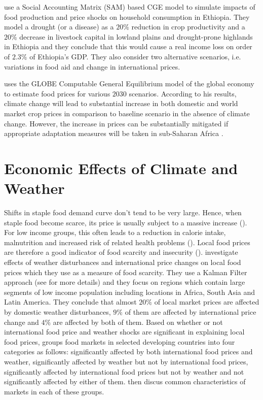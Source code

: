 \documentclass[a4paper,12pt]{article}
\begin{document}
\cite{robinson2010} use a Social Accounting Matrix (SAM) based CGE model to simulate impacts of food production and price shocks on household consumption in Ethiopia. They model a drought (or a disease) as a $20\%$ reduction in crop productivity and a $20\%$ decrease in livestock capital in lowland plains and drought-prone highlands in Ethiopia and they conclude that this would cause a real income loss on order of $2.3\%$ of Ethiopia's GDP. They also consider two alternative scenarios, i.e. variations in food aid and change in international prices.

\cite{OxfamIDS} uses the GLOBE Computable General Equilibrium model of the global economy to estimate food prices for various $2030$ scenarios. According to his results, climate change will lead to substantial increase in both domestic and world market crop prices in comparison to baseline scenario in the absence of climate change. However, the increase in prices can be substantially mitigated if appropriate adaptation measures will be taken in sub-Saharan Africa \citep{OxfamIDS}.
 \section*{Economic Effects of Climate and Weather}
 
Shifts in staple food demand curve don't tend to be very large. Hence, when staple food become scarce, its price is usually subject to a massive increase (\citealp{Brown2015, brown2014book}). For low income groups, this often leads to a reduction in calorie intake, malnutrition and increased risk of related health problems (\citealp{Golden2011, Handa2006}). Local food prices are therefore a good indicator of food scarcity and insecurity (\citealp{baffes2017, Brown2015}). \cite{Brown2015} investigate effects of weather disturbances and international price changes on local food prices which they use as a measure of food scarcity. They use a Kalman Filter approach (see \cite{KoopmanSJ} for more details) and they focus on regions which contain large segments of low income population including locations in Africa, South Asia and Latin America. They conclude that almost $20\%$ of local market prices are affected by domestic weather disturbances, $9\%$ of them are affected by international price change and $4\%$ are affected by both of them. Based on whether or not international food price and weather shocks are significant in explaining local food prices, \cite{brown2014book} groups food markets in selected developing countries into four categories as follows: significantly affected by both international food prices and weather, significantly affected by weather but not by international food prices, significantly affected by international food prices but not by weather and not significantly affected by either of them. \cite{brown2014book} then discus common characteristics of markets in each of these groups.
\end{document}
